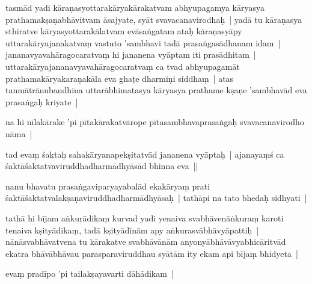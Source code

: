 \documentclass[article,12pt,a4paper]{memoir}%
\newcounter{parCount}
\begin{document}
	  
	  \pstart \leavevmode%
	\label{thakur75-77.12}tasmād yadi kāraṇasyottarakāryakārakatvam abhyupagamya kāryasya prathamakṣaṇabhāvitvam āsajyate, syāt svavacanavirodhaḥ | yadā tu kāraṇasya sthiratve kāryasyottarakālatvam evāsaṅgatam ataḥ kāraṇasyāpy uttarakāryajanakatvaṃ vastuto 'sambhavi tadā prasaṅgasādhanam idam | jananavyavahāragocaratvaṃ hi jananena vyāptam iti prasādhitam | uttarakāryajananavyavahāragocaratvaṃ ca tvad abhyupagamāt prathamakāryakaraṇakāla eva ghaṭe dharmiṇi siddhaṃ | atas tanmātrānubandhina uttarābhimatasya kāryasya prathame kṣaṇe 'sambhavād eva prasaṅgaḥ kriyate | 
	{}
	\pend%
      

	  
	  \pstart \leavevmode%
	\label{thakur75-77.20}na hi nīlakārake 'pi pītakārakatvārope pītasambhavaprasaṅgaḥ svavacanavirodho nāma | 
	{}
	\pend%
      

	  
	  \pstart \leavevmode%
	\label{thakur75-77.21}tad evaṃ śaktaḥ sahakāryanapekṣitatvād jananena vyāptaḥ | ajanayaṃś ca śaktāśaktatvaviruddhadharmādhyāsād bhinna eva ||
	{}
	\pend%
      

	  
	  \pstart \leavevmode%
	\label{thakur75-77.23}nanu bhavatu prasaṅgaviparyayabalād ekakāryaṃ prati śaktāśaktatvalakṣaṇaviruddhadharmādhyāsaḥ | tathāpi na tato bhedaḥ sidhyati | 
	{}
	\pend%
      

	  
	  \pstart \leavevmode%
	\label{thakur75-77.24}tathā hi bījam aṅkurādikaṃ kurvad yadi yenaiva svabhāvenāṅkuraṃ karoti tenaiva kṣityādikaṃ, tadā kṣityādīnām apy aṅkurasvābhāvyāpattiḥ | nānāsvabhāvatvena tu kārakatve svabhāvānām anyonyābhāvāvyabhicāritvād ekatra bhāvābhāvau parasparaviruddhau syātām ity ekam api bījaṃ bhidyeta |
	{}
	\pend%
      

	  
	  \pstart \leavevmode%
	\label{thakur75-77.28}evaṃ pradīpo 'pi tailakṣayavarti dāhādikam | 
	{}
	\pend%
      
\end{document}
